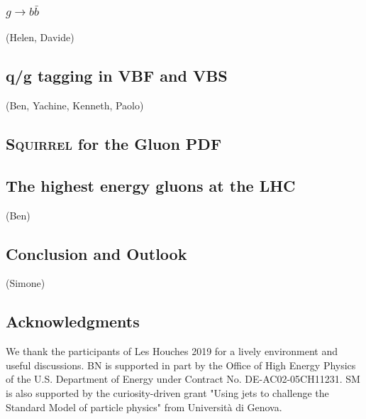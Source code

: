 \documentclass[11pt]{cernrep}
\begin{document}





\subsubsection{$g\to b \bar b$}
\label{sec:jets:gbb}
(Helen, Davide)

\subsection{q/g tagging in VBF and VBS}
\label{sec:jets:vbsbvf}
(Ben, Yachine, Kenneth, Paolo)



\subsection{\textsc{Squirrel} for the Gluon PDF}
\label{sec:jets:pdf}



\subsection{The highest energy gluons at the LHC}
\label{sec:jets:highest}
(Ben)

\subsection{Conclusion and Outlook}
\label{sec:jets:conclusion}
(Simone)

\subsection*{Acknowledgments}

We thank the participants of Les Houches 2019 for a lively environment and useful discussions.
BN is supported in part by the Office of High Energy Physics of the U.S. Department of Energy under Contract No. DE-AC02-05CH11231.
%
SM is also supported by the curiosity-driven grant "Using jets to challenge the Standard Model of particle physics" from Universit\`a di Genova.


\end{document}
